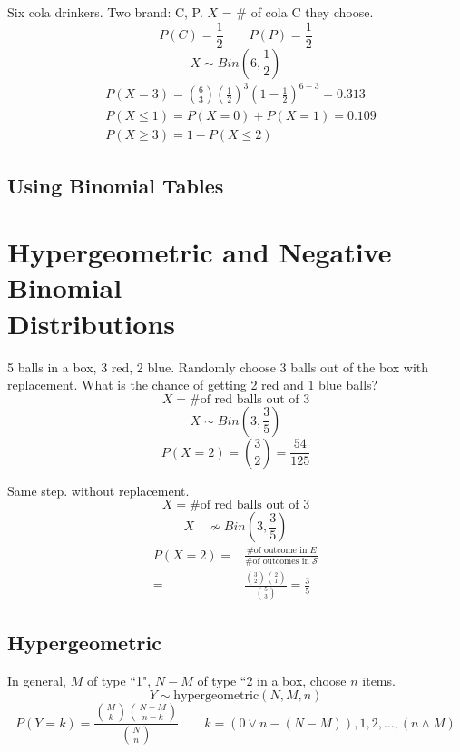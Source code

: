 \begin{exmp}
Six cola drinkers. Two brand: C, P. $X$ = \# of cola C they choose.
\[P(C)=\frac{1}{2} \qquad P(P)=\frac{1}{2}\]
\[X \sim Bin \left(6,\frac{1}{2} \right)\]
\begin{align*}
&P(X=3)=\binom 63 \left(\frac{1}{2}\right)^3	\left(1-\frac{1}{2}\right)^{6-3}=0.313 \\
&P(X \leq 1)=P(X=0)+P(X=1)=0.109 \\
&P(X \geq 3)=1-P(X \leq 2)
\end{align*}
\end{exmp}

\subsection{Using Binomial Tables}

\section{Hypergeometric and Negative Binomial\\ Distributions}
\begin{exmp}
5 balls in a box, 3 red, 2 blue. Randomly choose 3 balls out of the box with replacement. What is the chance of getting 2 red and 1 blue balls?
\[X= \text{\# of red balls out of 3}\]
\[X \sim  Bin\left(3,\frac{3}{5}\right)\]
\[P(X=2)=\binom 32 =\frac{54}{125}\]
\end{exmp}

\begin{exmp}
Same step. without replacement.
\[X= \text{\# of red balls out of 3}\]
\[X \quad  \not\sim  Bin\left(3,\frac{3}{5}\right)\]
\begin{align*}
P(X=2)=& \frac{\text{\# of outcome in } E}{\text{\# of outcomes in } \mathcal{S}} \\
=& \frac{\binom 32 \binom 21}{\binom 53} =\frac{3}{5}
\end{align*}
\end{exmp}

\subsection{Hypergeometric}
\begin{prop}
In general, $M$ of type ``1", $N-M$ of type ``2 in a box, choose $n$ items.
\[Y \sim \text{hypergeometric}(N,M,n)\]
\[P(Y=k)=\frac{\binom Mk \binom {N-M}{n-k}}{\binom N n}\qquad k=(0 \vee n-(N-M)),1,2,\dots,(n \wedge M)\]
\end{prop}

